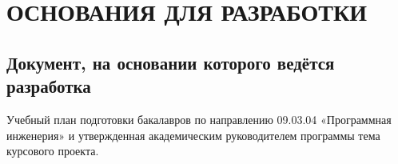 \section{ОСНОВАНИЯ ДЛЯ РАЗРАБОТКИ}

\subsection{Документ, на основании которого ведётся разработка}

Учебный план подготовки бакалавров по направлению 09.03.04 «Программная инженерия» и утвержденная академическим руководителем программы тема курсового проекта.
